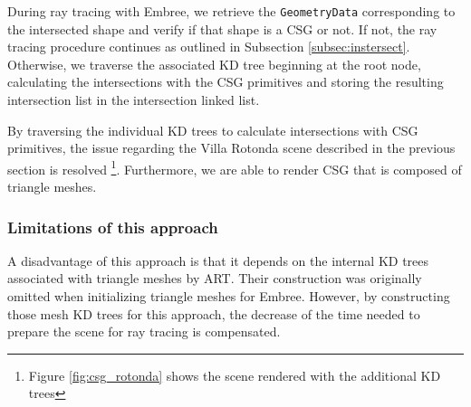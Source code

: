 During ray tracing with Embree, we retrieve the \texttt{GeometryData} corresponding to the intersected shape and verify if that shape is a CSG or not. If not, the ray tracing procedure continues as outlined in Subsection \ref{subsec:instersect}. Otherwise, we traverse the associated KD tree beginning at the root node, calculating the intersections with the CSG primitives and storing the resulting intersection list in the intersection linked list.

By traversing the individual KD trees to calculate intersections with CSG primitives, the issue regarding the Villa Rotonda scene described in the previous section is resolved \footnote{Figure \ref{fig:csg_rotonda} shows the scene rendered with the additional KD trees}. Furthermore, we are able to render CSG that is composed of triangle meshes.

\subsubsection{Limitations of this approach}

A disadvantage of this approach is that it depends on the internal KD trees associated with triangle meshes by ART. Their construction was originally omitted when initializing triangle meshes for Embree. However, by constructing those mesh KD trees for this approach, the decrease of the time needed to prepare the scene for ray tracing is compensated.